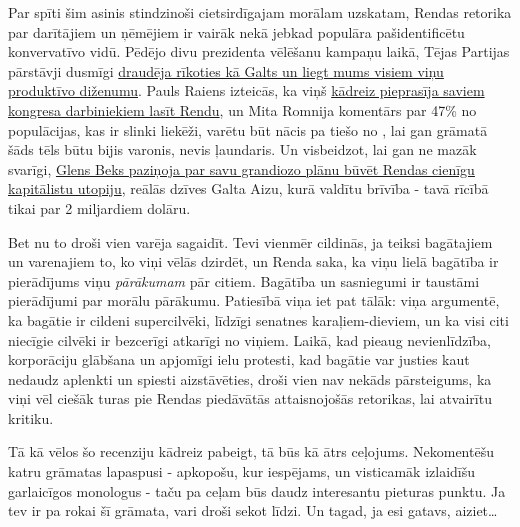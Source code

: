 \documentclass[12pt]{article}
\begin{document}
Par spīti šim asinis stindzinoši cietsirdīgajam morālam uzskatam, Rendas retorika par da\-rī\-tā\-jiem un ņēmējiem ir vairāk nekā jebkad populāra pašidentificētu konvervatīvo vidū. Pēdējo divu prezidenta vēlēšanu kampaņu laikā, Tējas Partijas pārstāvji dusmīgi  \href{https://web.archive.org/web/20160309004804/http://opinionator.blogs.nytimes.com/2009/03/06/going-galt-everyones-doing-it/?ref=opinion}{draudēja rīkoties kā Galts un liegt mums visiem viņu produktīvo diženumu}. Pauls Raiens izteicās, ka viņš \href{https://web.archive.org/web/20160421063828/http://www.thewire.com/politics/2012/04/how-tell-paul-ryan-wants-be-veep-hes-rejected-his-former-idol-ayn-rand/51605}{kādreiz pieprasīja saviem kongresa darbiniekiem lasīt Rendu}, un Mita Romnija komentārs par 47\% no populācijas, kas ir slinki liekēži, varētu būt nācis pa tiešo no , lai gan grāmatā šāds tēls būtu bijis varonis, nevis ļaundaris. Un visbeidzot, lai gan ne mazāk svarīgi,  \href{https://web.archive.org/web/20160309004804/http://www.rightwingwatch.org/content/independence-park-be-glenn-becks-galts-gulch}{Glens Beks paziņoja par savu grandiozo plānu būvēt Rendas cienīgu kapitālistu utopiju}, reālās dzīves Galta Aizu, kurā valdītu brīvība - tavā rīcībā tikai par 2 miljardiem dolāru.

Bet nu to droši vien varēja sagaidīt. Tevi vienmēr cildinās, ja teiksi bagātajiem un varenajiem to, ko viņi vēlās dzirdēt, un Renda saka, ka viņu lielā bagātība ir pierādījums viņu \textit{pārākumam} pār citiem. Bagātība un sasniegumi ir taustāmi pierādījumi par morālu pārākumu. Patiesībā viņa iet pat tālāk: viņa argumentē, ka bagātie ir cildeni supercilvēki, līdzīgi senatnes karaļiem-dieviem, un ka visi citi niecīgie cilvēki ir bezcerīgi atkarīgi no viņiem. Laikā, kad pieaug nevienlīdzība, korporāciju glābšana un apjomīgi ielu protesti, kad bagātie var justies kaut nedaudz aplenkti un spiesti aizstāvēties, droši vien nav nekāds pārsteigums, ka viņi vēl ciešāk turas pie Rendas piedāvātās attaisnojošās retorikas, lai atvairītu kritiku.

Tā kā vēlos šo recenziju kādreiz pabeigt, tā būs kā ātrs ceļojums. Nekomentēšu katru grāmatas lapaspusi - apkopošu, kur iespējams, un visticamāk izlaidīšu garlaicīgos monologus - taču pa ceļam būs daudz interesantu pieturas punktu. Ja tev ir pa rokai šī grāmata, vari droši sekot līdzi. Un tagad, ja esi gatavs, aiziet…
\end{document}
